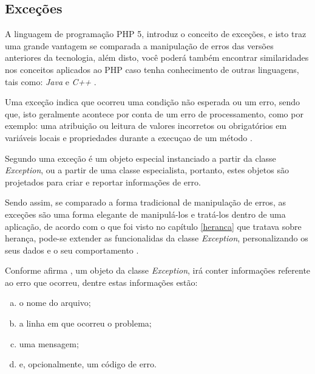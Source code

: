 \subsection{Exceções}

A linguagem de programação \acs{PHP} 5, introduz o conceito de exceções, e isto traz
uma grande vantagem se comparada a manipulação de erros das versões anteriores
da tecnologia, além disto, você poderá também encontrar similaridades nos
conceitos aplicados ao \acs{PHP} caso tenha conhecimento de outras linguagens, tais
como: \textit{Java} e \textit{C++} \cite{phpObjectsPatternsAndPractice}.

Uma exceção indica que ocorreu uma condição não esperada ou um erro, sendo que,
isto geralmente acontece por conta de um erro de processamento, como por
exemplo: uma atribuição ou leitura de valores incorretos ou obrigatórios em
variáveis locais e propriedades durante a execuçao de um método \cite{learningJava}.

Segundo  uma exceção é um objeto
especial instanciado a partir da classe \textit{Exception}, ou a partir de uma
classe especialista, portanto, estes objetos são projetados para criar e
reportar informações de erro.

Sendo assim, se comparado a forma tradicional de manipulação de erros, as
exceções são uma forma elegante de manipulá-los e tratá-los dentro de uma
aplicação, de acordo com o que foi visto no capítulo \ref{heranca} que
tratava sobre herança, pode-se extender as funcionalidas da classe
\textit{Exception}, personalizando os seus dados e o seu comportamento \cite{phpMasterWriteCuttingEdgeCode}.

Conforme afirma , um objeto da classe
\textit{Exception}, irá conter informações referente ao erro que ocorreu, dentre
estas informações estão:

\begin{enumerate}[a)]
    \item o nome do arquivo;
    \item a linha em que ocorreu o problema;
    \item uma mensagem;
    \item e, opcionalmente, um código de erro.
\end{enumerate}

